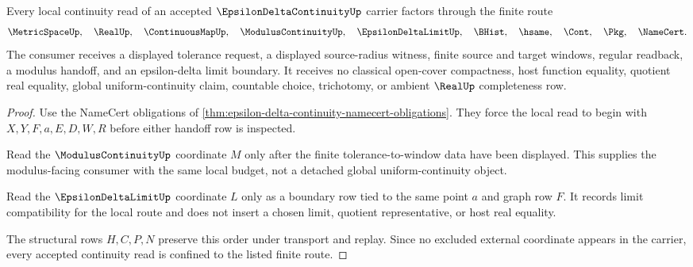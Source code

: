 \begin{theorem}
\label{thm:epsilon-delta-continuity-local-route}
Every local continuity read of an accepted $\EpsilonDeltaContinuityUp$ carrier factors through the finite route
$$
\MetricSpaceUp,\quad \RealUp,\quad \ContinuousMapUp,\quad \ModulusContinuityUp,\quad \EpsilonDeltaLimitUp,\quad \BHist,\quad \hsame,\quad \Cont,\quad \Pkg,\quad \NameCert .
$$
The consumer receives a displayed tolerance request, a displayed source-radius witness, finite source and target windows, regular readback, a modulus handoff, and an epsilon-delta limit boundary. It receives no classical open-cover compactness, host function equality, quotient real equality, global uniform-continuity claim, countable choice, trichotomy, or ambient $\RealUp$ completeness row.
\end{theorem}
\begin{proof}
Use the NameCert obligations of \autoref{thm:epsilon-delta-continuity-namecert-obligations}. They force the local read to begin with $X,Y,F,a,E,D,W,R$ before either handoff row is inspected.

Read the $\ModulusContinuityUp$ coordinate $M$ only after the finite tolerance-to-window data have been displayed. This supplies the modulus-facing consumer with the same local budget, not a detached global uniform-continuity object.

Read the $\EpsilonDeltaLimitUp$ coordinate $L$ only as a boundary row tied to the same point $a$ and graph row $F$. It records limit compatibility for the local route and does not insert a chosen limit, quotient representative, or host real equality.

The structural rows $H,C,P,N$ preserve this order under transport and replay. Since no excluded external coordinate appears in the carrier, every accepted continuity read is confined to the listed finite route.
\end{proof}


